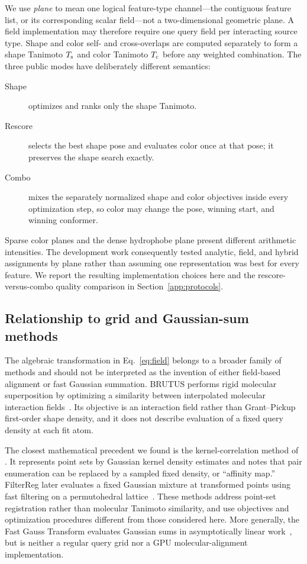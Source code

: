 We use \emph{plane} to mean one logical feature-type channel---the contiguous
feature list, or its corresponding scalar field---not a two-dimensional
geometric plane. A field implementation may therefore require one query field
per interacting source type. Shape and color self- and cross-overlaps are
computed separately to form a shape Tanimoto $T_{\rm s}$ and color Tanimoto
$T_{\rm c}$ before any weighted combination. The three public modes have
deliberately different semantics:

\begin{description}
 \item[Shape] optimizes and ranks only the shape Tanimoto.
 \item[Rescore] selects the best shape pose and evaluates color once at that
 pose; it preserves the shape search exactly.
 \item[Combo] mixes the separately normalized shape and color objectives inside
 every optimization step, so color may change the pose, winning start, and
 winning conformer.
\end{description}

Sparse color planes and the dense hydrophobe plane present different arithmetic
intensities. The development work consequently tested analytic, field, and
hybrid assignments by plane rather than assuming one representation was best
for every feature. We report the resulting implementation choices here and the
rescore-versus-combo quality comparison in Section~\ref{app:protocols}.

\subsection{Relationship to grid and Gaussian-sum methods}

The algebraic transformation in Eq.~\ref{eq:field} belongs to a broader family
of methods and should not be interpreted as the invention of either field-based
alignment or fast Gaussian summation. BRUTUS performs rigid molecular
superposition by optimizing a similarity between interpolated molecular
interaction fields~\citep{ronkko2006brutus}. Its objective is an interaction
field rather than Grant--Pickup first-order shape density, and it does not
describe evaluation of a fixed query density at each fit atom.

The closest mathematical precedent we found is the kernel-correlation method
of \citet{tsin2004correlation}. It represents point sets by Gaussian kernel
density estimates and notes that pair enumeration can be replaced by a sampled
fixed density, or ``affinity map.'' FilterReg later evaluates a fixed Gaussian
mixture at transformed points using fast filtering on a permutohedral
lattice~\citep{gao2019filterreg}. These methods address point-set registration
rather than molecular Tanimoto similarity, and use objectives and optimization
procedures different from those considered here. More generally, the Fast
Gauss Transform evaluates Gaussian sums in asymptotically linear
work~\citep{greengard1991fast}, but is neither a regular query grid nor a GPU
molecular-alignment implementation.

